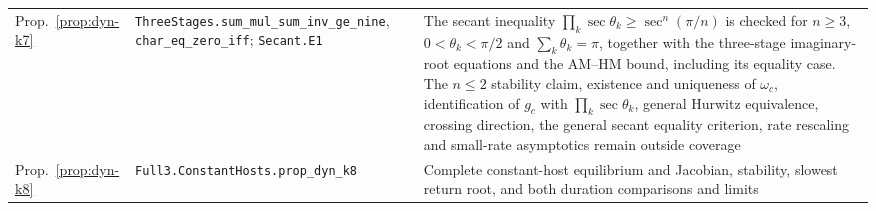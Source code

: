 \begin{table}[ht]
\begin{tabular*}{\textwidth}{@{\extracolsep\fill}lp{}p{}@{}}
Prop.~\ref{prop:dyn-k7} & \raggedright \texttt{ThreeStages.}\allowbreak\texttt{sum\_mul\_sum\_inv\_ge\_nine}, \texttt{char\_eq\_zero\_iff}; \texttt{Secant.E1} & \raggedright The secant inequality $\prod_k\sec\theta_k\ge\sec^n(\pi/n)$ is checked for $n\ge3$, $0<\theta_k<\pi/2$ and $\sum_k\theta_k=\pi$, together with the three-stage imaginary-root equations and the AM--HM bound, including its equality case. The $n\le2$ stability claim, existence and uniqueness of $\omega_c$, identification of $g_c$ with $\prod_k\sec\theta_k$, general Hurwitz equivalence, crossing direction, the general secant equality criterion, rate rescaling and small-rate asymptotics remain outside coverage \tabularnewline
Prop.~\ref{prop:dyn-k8} & \raggedright \texttt{Full3.ConstantHosts.}\allowbreak\texttt{prop\_dyn\_k8} & \raggedright Complete constant-host equilibrium and Jacobian, stability, slowest return root, and both duration comparisons and limits \tabularnewline
\bottomrule
\end{tabular*}
\end{table}
